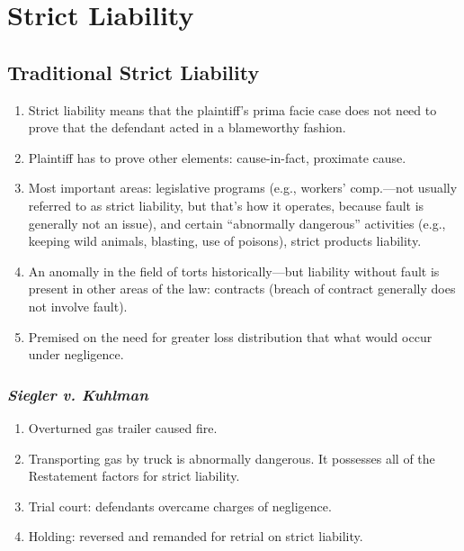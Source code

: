 \section{Strict Liability}

\subsection{Traditional Strict Liability}

\begin{enumerate}
    \item Strict liability means that the plaintiff's prima facie case does not 
    need to prove that the defendant acted in a blameworthy fashion.  \item 
    Plaintiff has to prove other elements: cause-in-fact, proximate cause.
    \item Most important areas: legislative programs (e.g., workers' comp.---not 
    usually referred to as strict liability, but that's how it operates, because 
    fault is generally not an issue), and certain ``abnormally dangerous'' 
    activities (e.g., keeping wild animals, blasting, use of poisons), strict 
    products liability.
    \item An anomally in the field of torts historically---but liability without 
    fault is present in other areas of the law: contracts (breach of contract 
    generally does not involve fault).
    \item Premised on the need for greater loss distribution that what would 
    occur under negligence.
\end{enumerate}

% 
% 
% 

\subsubsection{\emph{Siegler v. Kuhlman}}

\begin{enumerate}
    \item Overturned gas trailer caused fire.
    \item Transporting gas by truck is abnormally dangerous. It possesses all of 
    the Restatement factors for strict liability.
    \item Trial court: defendants overcame charges of negligence.
    \item Holding: reversed and remanded for retrial on strict liability.
\end{enumerate}

